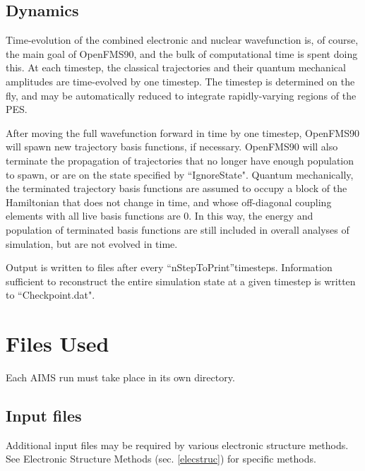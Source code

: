 \documentclass[11pt]{article}
\begin{document}
\subsection{Dynamics}
\label{dyn}

Time-evolution of the combined electronic and nuclear wavefunction is, of course, the main goal of OpenFMS90, and the bulk of computational time is spent doing this. At each timestep, the classical trajectories and their quantum mechanical amplitudes are time-evolved by one timestep. The timestep is determined on the fly, and may be automatically reduced to integrate rapidly-varying regions of the PES.

After moving the full wavefunction forward in time by one timestep, OpenFMS90 will spawn new trajectory basis functions, if necessary. OpenFMS90 will also terminate the propagation of trajectories that no longer have enough population to spawn, or are on the state specified by ``IgnoreState". Quantum mechanically, the terminated trajectory basis functions are assumed to occupy a block of the Hamiltonian that does not change in time, and whose off-diagonal coupling elements with all live basis functions are 0. In this way, the energy and population of terminated basis functions are still included in overall analyses of simulation, but are not evolved in time.

Output is written to files after every ``nStepToPrint''timesteps. Information sufficient to reconstruct the entire simulation state at a given timestep is written to ``Checkpoint.dat".






\newpage \section{Files Used}
\label{files} 

Each AIMS run must take place in its own directory.

\subsection{Input files}
\label{inputfiles} 

Additional input files may be required by various electronic structure methods. See Electronic Structure Methods  (sec. \ref{elecstruc}) for specific methods.
\end{document}
